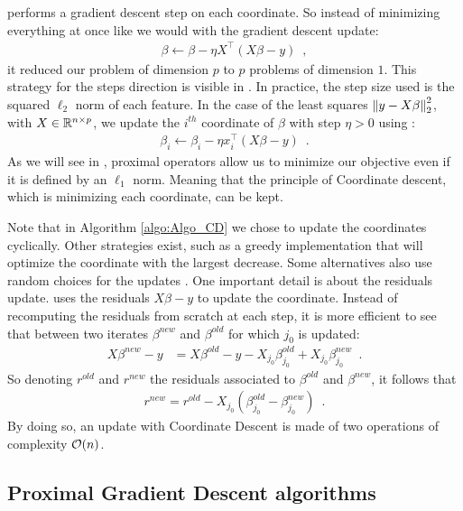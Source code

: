 \documentclass[../main.tex]{subfiles}
\begin{document}
 performs a gradient descent step on each coordinate.
So instead of minimizing everything at once like we would with the gradient
descent update:
\begin{align}\label{eq:gd_step}
 \beta \longleftarrow \beta - \eta X^\top (X\beta - y) \enspace,
\end{align}
it reduced our problem of dimension $p$ to $p$ problems of dimension $1$.
This strategy for the steps direction is visible in .
In practice, the step size used is the squared $\ell_2$ norm of each feature.
In the case of the least squares $\left \lVert y - X\beta \right \rVert_2^2$,
with $X\in\mathbb{R}^{n\times p}$, we update the $i^{th}$ coordinate of $\beta$
with step $\eta>0$ using :
\begin{align}\label{eq:update_beta_cd}
	\beta_i \longleftarrow \beta_i - \eta x_i^\top (X\beta - y)\enspace.
\end{align}
As we will see in , proximal operators allow us to minimize
our objective even if it is defined by an $\ell_1$ norm.
Meaning that the principle of Coordinate descent, which is minimizing each
coordinate, can be kept.

\medskip

Note that in Algorithm \ref{algo:Algo_CD} we chose to update the coordinates
cyclically.
Other strategies exist, such as a greedy implementation that will optimize
the coordinate with the largest decrease.
Some alternatives also use random choices for the updates \citep{nesterov2012efficiency}.
One important detail is about the residuals update.
 uses the residuals $X\beta - y$ to update the coordinate.
Instead of recomputing the residuals from scratch at each step, it is more
efficient to see that between two iterates $\beta^{new}$ and $\beta^{old}$
for which $j_0$ is updated:
\begin{align*}
X\beta^{new} - y
& = X\beta^{old} - y - X_{j_0}\beta^{old}_{j_0} + X_{j_0} \beta^{new}_{j_0}
\enspace.
\end{align*}
So denoting $r^{old}$ and $r^{new}$ the residuals associated to $\beta^{old}$
and $\beta^{new}$, it follows that
\begin{align}\label{eq:resid_upd_cd}
	r^{new} = r^{old} - X_{j_0} (\beta^{old}_{j_0} - \beta^{new}_{j_0})
	\enspace.
\end{align}
By doing so, an update with Coordinate Descent is made of two operations
of complexity $\mathcal{O}(n)$.

\subsection{Proximal Gradient Descent algorithms}\label{sub:pgd_algo}
\end{document}

